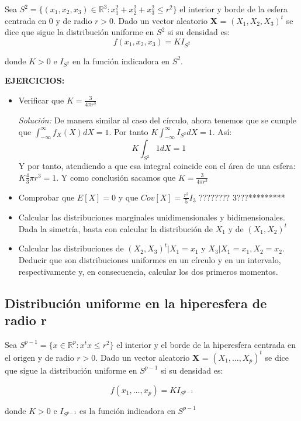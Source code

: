 \documentclass{article}
\theoremstyle{theorem-style}  %
\theoremstyle{definition}
\theoremstyle{example-style}
\begin{document}
	Sea $S^2=\{(x_1, x_2, x_3) \in  \mathbb{R}^3: x_1^2 + x_2^2+x_3^2\leq r^2\}$ el interior y borde de la esfera centrada en 0 y de radio $r>0$. Dado un vector aleatorio \textbf{X} = $(X_1, X_2, X_3)^t$ se dice que sigue la distribución uniforme en $S^2$ si su densidad es:
	$$ f(x_1, x_2, x_3)= KI_{S^2}$$
	
	donde $K>0$ e $I_{S^2}$ en la función indicadora en $S^2$. 
	
	\textbf{EJERCICIOS:}
	\begin{itemize}
		\item Verificar que $K=\frac{3}{4\pi r^3}$
		
		\textit{Solución:} De manera similar al caso del círculo, ahora tenemos que se cumple que $\int_{-\infty}^{\infty} f_X(X) dX = 1$. Por tanto $K \int_{-\infty}^{\infty} I_{S^2} dX =1 $. Así: $$K \int_{S^2}^{}1dX = 1 $$ Y por tanto, atendiendo a que esa integral coincide con el área de una esfera: $K\frac{4}{3}\pi r^3 = 1$. Y como conclusión sacamos que $K=\frac{3}{4\pi r^3}$
		
		\item   Comprobar que $E[X]=0$ y que $Cov[X] = \frac{r^2}{5}I_3$ ???????? 3???*********
		
		\item Calcular las distribuciones marginales unidimensionales y bidimensionales. Dada la simetría, basta con calcular la distribución de $X_1$ y de $(X_1, X_2)^t$
		
		\item Calcular las distribuciones de $(X_2, X_3)^t|X_1=x_1$ y $X_3|X_1=x_1, X_2=x_2$. Deducir que son distribuciones uniformes en un círculo y en un intervalo, respectivamente y, en consecuencia, calcular los dos primeros momentos.
		
	\end{itemize}
	
	\subsection{Distribución uniforme en la hiperesfera de radio r}
	
	Sea $S^{p-1} = \{x \in \mathbb{R}^p: x^tx\leq r^2\}$ el interior y el borde de la hiperesfera centrada en el origen y de radio $r>0$. Dado un vector aleatorio \textbf{X} = $(X_1, \dots , X_p)^t$ se dice que sigue la distribución uniforme en $S^{p-1}$ si su densidad es:
	
	$$f(x_1, \dots, x_p)= KI_{S^{p-1}}$$
	
	donde $K>0$ e $I_{S^{p-1}}$ es la función indicadora en $ S^{p-1}$
	
\end{document}

